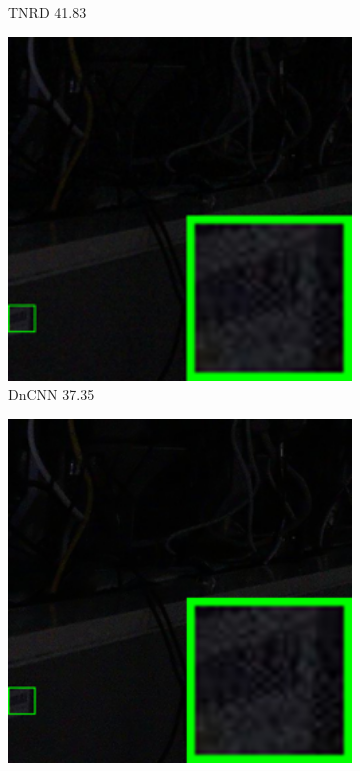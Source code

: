 \begin{figure}
\begin{subfigure}[t]{0.19\textwidth}
\caption{TNRD 41.83}
    \end{subfigure}
\hfill
    \begin{subfigure}[t]{0.19\textwidth}
        \centering
        \includegraphics[width=1\textwidth]{images/guided/our/resize_br_DnCNN_SONY_A7II_ISO6400_DSC03017_part5.png}
		\caption{DnCNN 37.35}
    \end{subfigure}
    \hfill
    \begin{subfigure}[t]{0.19\textwidth}
        \centering
        \includegraphics[width=1\textwidth]{images/guided/our/resize_br_NI_SONY_A7II_ISO6400_DSC03017_part5.png}

\end{subfigure}
\end{figure}
